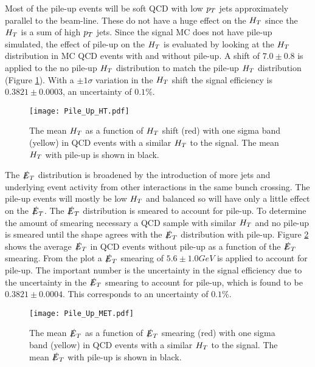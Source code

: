 Most of the pile-up events will be soft QCD with low $p_{T}$ jets approximately 
parallel to the beam-line. These do not have a huge effect on the $H_{T}$ since 
the $H_{T}$ is a sum of high $p_{T}$ jets. Since the signal MC does not have pile-up
simulated, the effect of pile-up on the $H_{T}$ is evaluated by looking at the
$H_{T}$ distribution in MC QCD events with and without pile-up. A shift of 
$7.0\pm0.8$ is applied to the no pile-up $H_{T}$ distribution to match the pile-up 
$H_{T}$ distribution (Figure \ref{fig:Pile_Up_HT}). With a $\pm1\sigma$ variation
in the $H_{T}$ shift the signal efficiency is $0.3821\pm0.0003$, an uncertainty of
$0.1\unit{\%}$. \\

\begin{figure}
\begin{center}
\texttt{[image: Pile\_Up\_HT.pdf]}
\end{center}
\caption{The mean $H_{T}$ as a function of $H_{T}$ shift (red) with one sigma band 
(yellow) in QCD events with a similar $H_{T}$ to the signal. The mean $H_{T}$ with 
pile-up is shown in black.}
\label{fig:Pile_Up_HT}
\end{figure}

The $\slashed{E}_{T}$ distribution is broadened by the introduction of more jets and
underlying event activity from other interactions in the same bunch crossing. 
The pile-up events will mostly be low $H_{T}$ and balanced so will have only a 
little effect on the $\slashed{E}_{T}$. The $\slashed{E}_{T}$ distribution is smeared to account for 
pile-up. To determine the amount of smearing necessary a QCD sample with similar 
$H_{T}$ and no pile-up is smeared until the shape agrees with the $\slashed{E}_{T}$ 
distribution with pile-up. Figure \ref{fig:Pile_Up_MET} shows the 
average $\slashed{E}_{T}$ in QCD events without pile-up as a function of the $\slashed{E}_{T}$ 
smearing. From the plot a $\slashed{E}_{T}$ smearing of $5.6\pm1.0\unit{GeV}$ is applied to 
account for pile-up. The important number is the uncertainty in
the signal efficiency due to the uncertainty in the $\slashed{E}_{T}$ smearing to account
for pile-up, which is found to be $0.3821\pm0.0004$. This corresponds to an
uncertainty of $0.1\unit{\%}$.\\

\begin{figure}
\begin{center}
\texttt{[image: Pile\_Up\_MET.pdf]}
\end{center}
\caption{The mean $\slashed{E}_{T}$ as a function of $\slashed{E}_{T}$ smearing (red) with one sigma
band (yellow) in QCD events with a similar $H_{T}$ to the signal. The mean $\slashed{E}_{T}$ 
with pile-up is shown in black.}
\label{fig:Pile_Up_MET}
\end{figure}

